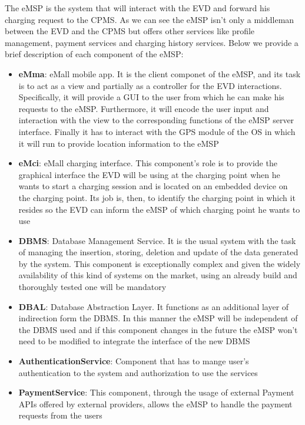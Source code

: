 The eMSP is the system that will interact with the EVD and forward his charging request to the CPMS. As we can see the eMSP isn't only a middleman between the EVD and the CPMS but offers other services like profile management, payment services and charging history services. Below we provide a brief description of each component of the eMSP:
\begin{itemize}
    \item \textbf{eMma}: eMall mobile app. It is the client componet of the eMSP, and its task is to act as a view and partially as a controller for the EVD interactions. Specifically, it will provide a GUI to the user from which he can make his requests to the eMSP. Furthermore, it will encode the user input and interaction with the view to the corresponding functions of the eMSP server interface. Finally it has to interact with the GPS module of the OS in which it will run to provide location information to the eMSP
    
    \item \textbf{eMci}: eMall charging interface. This component's role is to provide the graphical interface the EVD will be using at the charging point when he wants to start a charging session and is located on an embedded device on the charging point. Its job is, then, to identify the charging point in which it resides so the EVD can inform the eMSP of which charging point he wants to use

    \item \textbf{DBMS}: Database Management Service. It is the usual system with the task of managing the insertion, storing, deletion and update of the data generated by the system. This component is exceptionally complex and given the widely availability of this kind of systems on the market, using an already build and thoroughly tested one will be mandatory

    \item \textbf{DBAL}: Database Abstraction Layer. It functions as an additional layer of indirection form the DBMS. In this manner the eMSP will be independent of the DBMS used and if this component changes in the future the eMSP won't need to be modified to integrate the interface of the new DBMS

    \item \textbf{AuthenticationService}: Component that has to mange user's authentication to the system and authorization to use the services

    \item \textbf{PaymentService}: This component, through the usage of external Payment APIs offered by external providers, allows the eMSP to handle the payment requests from the users


\end{itemize}
